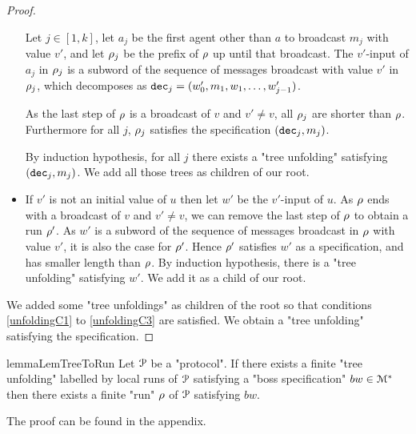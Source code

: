 \begin{proof}
\begin{itemize}
		Let $j \in [1,k]$, let $a_j$ be the first agent other than $a$ to broadcast $m_j$ with value $v'$, and let $\rho_j$ be the prefix of $\rho$ up until that broadcast. The $v'$-input of $a_j$ in $\rho_j$ is a subword of the sequence of messages broadcast with value $v'$ in $\rho_j$, which decomposes as $\mathtt{dec}_j = (w'_0, m_1, w_1, \ldots, w'_{j-1})$.
		
		As the last step of $\rho$ is a broadcast of $v$ and $v' \neq v$, all $\rho_j$ are shorter than $\rho$. Furthermore for all $j$, $\rho_j$ satisfies the specification $(\mathtt{dec}_j, m_j)$.		
		
		By induction hypothesis, for all $j$ there exists a "tree unfolding" satisfying $(\mathtt{dec}_j, m_j)$. We add all those trees as children of our root.
		
		\item If $v'$ is not an initial value of $u$ then let $w'$ be the $v'$-input of $u$. 
		 As $\rho$ ends with a broadcast of $v$ and $v' \neq v$, we can remove the last step of $\rho$ to obtain a run $\rho'$. As $w'$ is a subword of the sequence of messages broadcast in $\rho$ with value $v'$, it is also the case for $\rho'$.
		 Hence $\rho'$ satisfies $w'$ as a specification, and has smaller length than $\rho$. By induction hypothesis, there is a "tree unfolding" satisfying $w'$. We add it as a child of our root.
	\end{itemize}
	
	We added some "tree unfoldings" as children of the root so that conditions \ref{unfoldingC1} to \ref{unfoldingC3} are satisfied. We obtain a "tree unfolding" satisfying the specification.
\end{proof}
\fi



\begin{restatable}{lemma}{LemTreeToRun}
	\label{lem:tree-to-run}
	Let $\mathcal{P}$ be a "protocol".
	If there exists a finite "tree unfolding" labelled by local runs of $\mathcal{P}$ satisfying a "boss specification" $bw \in \mathcal{M}^*$ then there exists  a finite "run" $\rho$ of $\mathcal{P}$ satisfying $bw$.
\end{restatable}

The proof can be found in the appendix.



